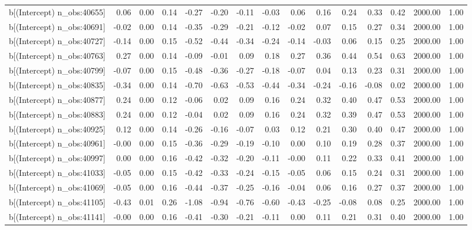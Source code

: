 \begin{table}[ht]
\begin{tabular}{rrrrrrrrrrrrrrr}
  b[(Intercept) n\_obs:40655] & 0.06 & 0.00 & 0.14 & -0.27 & -0.20 & -0.11 & -0.03 & 0.06 & 0.16 & 0.24 & 0.33 & 0.42 & 2000.00 & 1.00 \\ 
  b[(Intercept) n\_obs:40691] & -0.02 & 0.00 & 0.14 & -0.35 & -0.29 & -0.21 & -0.12 & -0.02 & 0.07 & 0.15 & 0.27 & 0.34 & 2000.00 & 1.00 \\ 
  b[(Intercept) n\_obs:40727] & -0.14 & 0.00 & 0.15 & -0.52 & -0.44 & -0.34 & -0.24 & -0.14 & -0.03 & 0.06 & 0.15 & 0.25 & 2000.00 & 1.00 \\ 
  b[(Intercept) n\_obs:40763] & 0.27 & 0.00 & 0.14 & -0.09 & -0.01 & 0.09 & 0.18 & 0.27 & 0.36 & 0.44 & 0.54 & 0.63 & 2000.00 & 1.00 \\ 
  b[(Intercept) n\_obs:40799] & -0.07 & 0.00 & 0.15 & -0.48 & -0.36 & -0.27 & -0.18 & -0.07 & 0.04 & 0.13 & 0.23 & 0.31 & 2000.00 & 1.00 \\ 
  b[(Intercept) n\_obs:40835] & -0.34 & 0.00 & 0.14 & -0.70 & -0.63 & -0.53 & -0.44 & -0.34 & -0.24 & -0.16 & -0.08 & 0.02 & 2000.00 & 1.00 \\ 
  b[(Intercept) n\_obs:40877] & 0.24 & 0.00 & 0.12 & -0.06 & 0.02 & 0.09 & 0.16 & 0.24 & 0.32 & 0.40 & 0.47 & 0.53 & 2000.00 & 1.00 \\ 
  b[(Intercept) n\_obs:40883] & 0.24 & 0.00 & 0.12 & -0.04 & 0.02 & 0.09 & 0.16 & 0.24 & 0.32 & 0.39 & 0.47 & 0.53 & 2000.00 & 1.00 \\ 
  b[(Intercept) n\_obs:40925] & 0.12 & 0.00 & 0.14 & -0.26 & -0.16 & -0.07 & 0.03 & 0.12 & 0.21 & 0.30 & 0.40 & 0.47 & 2000.00 & 1.00 \\ 
  b[(Intercept) n\_obs:40961] & -0.00 & 0.00 & 0.15 & -0.36 & -0.29 & -0.19 & -0.10 & 0.00 & 0.10 & 0.19 & 0.28 & 0.37 & 2000.00 & 1.00 \\ 
  b[(Intercept) n\_obs:40997] & 0.00 & 0.00 & 0.16 & -0.42 & -0.32 & -0.20 & -0.11 & -0.00 & 0.11 & 0.22 & 0.33 & 0.41 & 2000.00 & 1.00 \\ 
  b[(Intercept) n\_obs:41033] & -0.05 & 0.00 & 0.15 & -0.42 & -0.33 & -0.24 & -0.15 & -0.05 & 0.06 & 0.15 & 0.24 & 0.31 & 2000.00 & 1.00 \\ 
  b[(Intercept) n\_obs:41069] & -0.05 & 0.00 & 0.16 & -0.44 & -0.37 & -0.25 & -0.16 & -0.04 & 0.06 & 0.16 & 0.27 & 0.37 & 2000.00 & 1.00 \\ 
  b[(Intercept) n\_obs:41105] & -0.43 & 0.01 & 0.26 & -1.08 & -0.94 & -0.76 & -0.60 & -0.43 & -0.25 & -0.08 & 0.08 & 0.25 & 2000.00 & 1.00 \\ 
  b[(Intercept) n\_obs:41141] & -0.00 & 0.00 & 0.16 & -0.41 & -0.30 & -0.21 & -0.11 & 0.00 & 0.11 & 0.21 & 0.31 & 0.40 & 2000.00 & 1.00 \\ 

\end{tabular}
\end{table}
